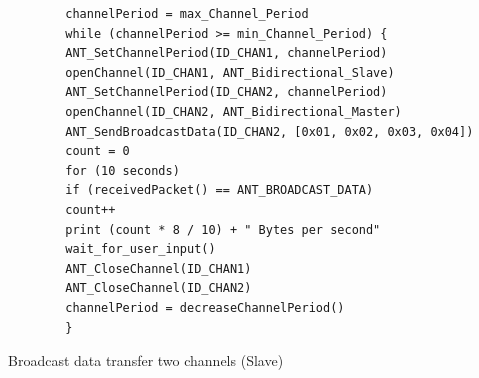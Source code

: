\begin{description}
	\begin{code}[H]
		\begin{verbatim}
		channelPeriod = max_Channel_Period
		while (channelPeriod >= min_Channel_Period) {
		ANT_SetChannelPeriod(ID_CHAN1, channelPeriod)
		openChannel(ID_CHAN1, ANT_Bidirectional_Slave)
		ANT_SetChannelPeriod(ID_CHAN2, channelPeriod)
		openChannel(ID_CHAN2, ANT_Bidirectional_Master)
		ANT_SendBroadcastData(ID_CHAN2, [0x01, 0x02, 0x03, 0x04])
		count = 0
		for (10 seconds) 
		if (receivedPacket() == ANT_BROADCAST_DATA)
		count++			
		print (count * 8 / 10) + " Bytes per second"
		wait_for_user_input()
		ANT_CloseChannel(ID_CHAN1)
		ANT_CloseChannel(ID_CHAN2)
		channelPeriod = decreaseChannelPeriod()
		}
		\end{verbatim}
		\caption{Broadcast data transfer two channels (Slave)}\label{lst:mExp2}
	\end{code}
	

\end{description}
